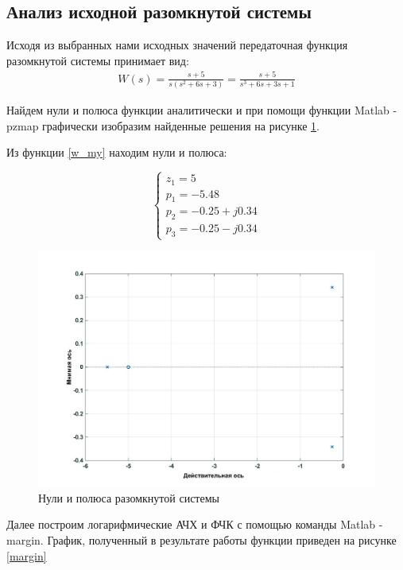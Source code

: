 \documentclass[a4paper, 12pt]{article}
\begin{document}
\newpage

\begin{center}
	\section{Анализ исходной разомкнутой системы}
\end{center}\par
Исходя из выбранных нами исходных значений передаточная функция разомкнутой системы принимает вид:
\begin{align}	
	W(s) = \frac{s + 5}{s(s^2 + 6s + 3)} = \frac{s + 5}{s^3 + 6s + 3s + 1}
	\label{w_my}
\end{align}\par
Найдем нули и полюса функции аналитически и при помощи функции Matlab - pzmap графически изобразим найденные решения на рисунке \ref{pzmap}.\par

Из функции \ref{w_my}  находим нули и полюса:

\begin{equation}
	\begin{cases}
		z_1 = 5\\	
		p_1 = -5.48\\	
		p_2 = -0.25 + j0.34\\	
		p_3 = -0.25 - j0.34
	\end{cases}
\end{equation}



\begin{figure}[h!]
	\centering
	\includegraphics[width = 0.6\textheight]{data/pzmap}
	\caption{Нули и полюса разомкнутой системы}
	\label{pzmap}
\end{figure}
Далее построим логарифмические АЧХ и ФЧК с помощью команды Matlab - margin. График, полученный в результате работы функции приведен на рисунке \ref{margin}
\end{document}
